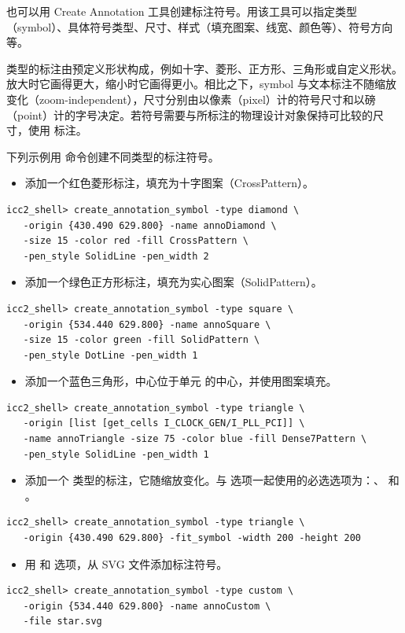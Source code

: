 也可以用 Create Annotation 工具创建标注符号。用该工具可以指定类型（symbol）、具体符号类型、尺寸、样式（填充图案、线宽、颜色等）、符号方向等。

 类型的标注由预定义形状构成，例如十字、菱形、正方形、三角形或自定义形状。放大时它画得更大，缩小时它画得更小。相比之下，symbol 与文本标注不随缩放变化（zoom-independent），尺寸分别由以像素（pixel）计的符号尺寸和以磅（point）计的字号决定。若符号需要与所标注的物理设计对象保持可比较的尺寸，使用  标注。

下列示例用  命令创建不同类型的标注符号。
\begin{itemize}
  \item 添加一个红色菱形标注，填充为十字图案（CrossPattern）。
\end{itemize}
\begin{lstlisting}
icc2_shell> create_annotation_symbol -type diamond \
   -origin {430.490 629.800} -name annoDiamond \
   -size 15 -color red -fill CrossPattern \
   -pen_style SolidLine -pen_width 2
\end{lstlisting}
\begin{itemize}
  \item 添加一个绿色正方形标注，填充为实心图案（SolidPattern）。
\end{itemize}
\begin{lstlisting}
icc2_shell> create_annotation_symbol -type square \
   -origin {534.440 629.800} -name annoSquare \
   -size 15 -color green -fill SolidPattern \
   -pen_style DotLine -pen_width 1
\end{lstlisting}
\begin{itemize}
  \item 添加一个蓝色三角形，中心位于单元  的中心，并使用图案填充。
\end{itemize}
\begin{lstlisting}
icc2_shell> create_annotation_symbol -type triangle \
   -origin [list [get_cells I_CLOCK_GEN/I_PLL_PCI]] \
   -name annoTriangle -size 75 -color blue -fill Dense7Pattern \
   -pen_style SolidLine -pen_width 1
\end{lstlisting}
\begin{itemize}
  \item 添加一个 \cmd{fit\_symbol} 类型的标注，它随缩放变化。与 \opt{-fit\_symbol} 选项一起使用的必选选项为：、 和 。
\end{itemize}
\begin{lstlisting}
icc2_shell> create_annotation_symbol -type triangle \
   -origin {430.490 629.800} -fit_symbol -width 200 -height 200
\end{lstlisting}
\begin{itemize}
  \item 用 \opt{-file} 和 \opt{-type} 选项，从 SVG 文件添加标注符号。
\end{itemize}
\begin{lstlisting}
icc2_shell> create_annotation_symbol -type custom \
   -origin {534.440 629.800} -name annoCustom \
   -file star.svg
\end{lstlisting}

